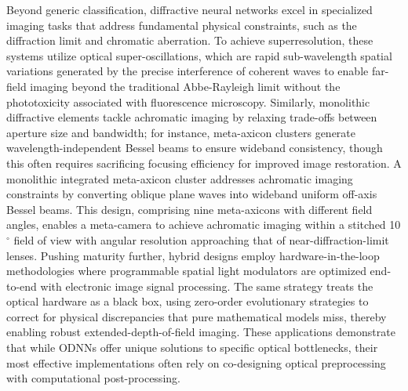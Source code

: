 Beyond generic classification, diffractive neural networks excel in specialized imaging tasks that address fundamental physical constraints, such as the diffraction limit and chromatic aberration. To achieve superresolution, these systems utilize optical super-oscillations, which are rapid sub-wavelength spatial variations generated by the precise interference of coherent waves to enable far-field imaging beyond the traditional Abbe-Rayleigh limit without the phototoxicity associated with fluorescence microscopy. \citep{doi_10_1117_12_2576293_e7634e1d} \citep{doi_10_1109_cleo_europe_eqec57999_2023_10231830_c702ffd4} Similarly, monolithic diffractive elements tackle achromatic imaging by relaxing trade-offs between aperture size and bandwidth; for instance, meta-axicon clusters generate wavelength-independent Bessel beams to ensure wideband consistency, though this often requires sacrificing focusing efficiency for improved image restoration. A monolithic integrated meta-axicon cluster addresses achromatic imaging constraints by converting oblique plane waves into wideband uniform off-axis Bessel beams. This design, comprising nine meta-axicons with different field angles, enables a meta-camera to achieve achromatic imaging within a stitched 10 \(^\circ\) field of view with angular resolution approaching that of near-diffraction-limit lenses. \citep{doi_10_1038_s41377_026_02272_y_42e58df2} Pushing maturity further, hybrid designs employ hardware-in-the-loop methodologies where programmable spatial light modulators are optimized end-to-end with electronic image signal processing. The same strategy treats the optical hardware as a black box, using zero-order evolutionary strategies to correct for physical discrepancies that pure mathematical models miss, thereby enabling robust extended-depth-of-field imaging. \citep{doi_10_1364_oe_461549_b2d41b3f} These applications demonstrate that while ODNNs offer unique solutions to specific optical bottlenecks, their most effective implementations often rely on co-designing optical preprocessing with computational post-processing. \citep{doi_10_1117_1_ap_6_5_056004_3f240d06} \citep{doi_10_1038_s41377_026_02272_y_42e58df2} \citep{doi_10_1364_oe_461549_b2d41b3f}

